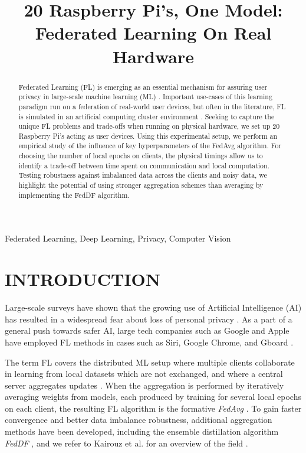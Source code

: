 \documentclass{article}
\title{20 Raspberry Pi's, One Model: Federated Learning On Real Hardware}
\begin{document}
%

\maketitle
%
\begin{abstract}
    Federated Learning (FL) is emerging as an essential mechanism for assuring user privacy in large-scale machine learning (ML) \cite{kai2021advances}.
    Important use-cases of this learning paradigm run on a federation of real-world user devices, but often in the literature, FL is simulated in an artificial computing cluster environment \cite{kai2021advances,mcmahan2017communication,lin2020ensemble}.
    Seeking to capture the unique FL problems and trade-offs when running on physical hardware, we set up 20 Raspberry Pi's acting as user devices.
    Using this experimental setup, we perform an empirical study of the influence of key hyperparameters of the FedAvg \cite{mcmahan2017communication} algorithm.
    For choosing the number of local epochs on clients, the physical timings allow us to identify a trade-off between time spent on communication and local computation.
    Testing robustness against imbalanced data across the clients and noisy data, we highlight the potential of using stronger aggregation schemes than averaging by implementing the FedDF \cite{lin2020ensemble} algorithm.
\end{abstract}
%
\begin{keywords}
    Federated Learning, Deep Learning, Privacy, Computer Vision
\end{keywords}


\section{INTRODUCTION}
\label{sec:intro}
Large-scale surveys have shown that the growing use of Artificial Intelligence (AI) has resulted in a widespread fear about loss of personal privacy \cite{beuc2020consumers, west2018survey}.
As a part of a general push towards safer AI, large tech companies such as Google and Apple have employed FL methods in cases such as Siri, Google Chrome, and Gboard \cite{kai2021advances}.

The term FL covers the distributed ML setup where multiple clients collaborate in learning from local datasets which are not exchanged, and where a central server aggregates updates \cite{kai2021advances, mcmahan2017communication}.
When the aggregation is performed by iteratively averaging weights from models, each produced by training for several local epochs on each client, the resulting FL algorithm is the formative \emph{FedAvg} \cite{mcmahan2017communication}.
To gain faster convergence and better data imbalance robustness, additional aggregation methods have been developed, including the ensemble distillation algorithm \emph{FedDF} \cite{lin2020ensemble}, and we refer to Kairouz et al. for an overview of the field \cite{kai2021advances}.
\end{document}
